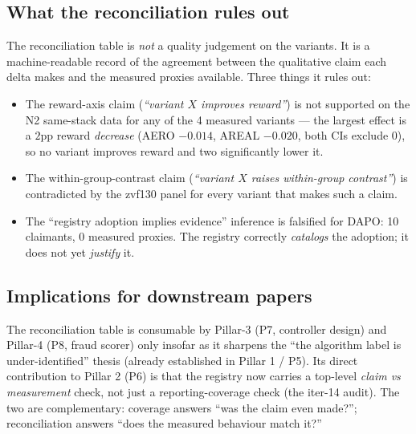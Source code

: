 \subsection{What the reconciliation rules out}
The reconciliation table is \emph{not} a quality judgement on the
variants. It is a machine-readable record of the agreement between the
qualitative claim each delta makes and the measured proxies available.
Three things it rules out:

\begin{itemize}
  \item The reward-axis claim (\emph{``variant $X$ improves reward''})
    is not supported on the N2 same-stack data for any of the 4
    measured variants --- the largest effect is a $2$pp reward
    \emph{decrease} (AERO $-0.014$, AREAL $-0.020$, both CIs exclude 0),
    so no variant improves reward and two significantly lower it.
  \item The within-group-contrast claim (\emph{``variant $X$ raises
    within-group contrast''}) is contradicted by the zvf130 panel for
    every variant that makes such a claim.
  \item The ``registry adoption implies evidence'' inference is
    falsified for DAPO: 10 claimants, 0 measured proxies. The registry
    correctly \emph{catalogs} the adoption; it does not yet
    \emph{justify} it.
\end{itemize}

\subsection{Implications for downstream papers}
The reconciliation table is consumable by Pillar-3 (P7, controller
design) and Pillar-4 (P8, fraud scorer) only insofar as it sharpens
the ``the algorithm label is under-identified'' thesis (already
established in Pillar 1 / P5). Its direct contribution to Pillar 2
(P6) is that the registry now carries a top-level \emph{claim vs
measurement} check, not just a reporting-coverage check (the iter-14
audit). The two are complementary: coverage answers ``was the claim
even made?''; reconciliation answers ``does the measured behaviour
match it?''